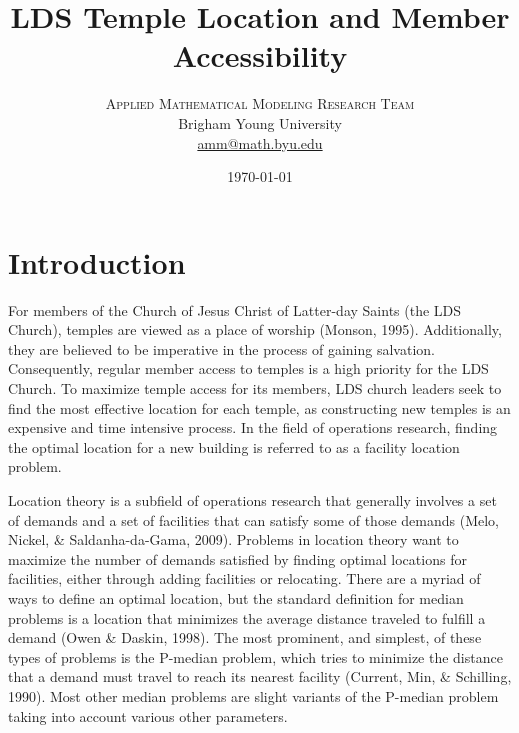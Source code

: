 \documentclass[twoside,twocolumn]{article}
\title{LDS Temple Location and Member Accessibility} %
\author{%
\textsc{Applied Mathematical Modeling Research Team}\\[1ex] %
\normalsize Brigham Young University  \\ %
\normalsize \href{mailto:amm@math.byu.edu}{amm@math.byu.edu} %
}
\date{\today} %
\begin{document}
\maketitle



\section{Introduction}


For members of the Church of Jesus Christ of Latter-day Saints (the LDS Church), temples are viewed as a place of worship (Monson, 1995).
Additionally, they are believed to be imperative in the process of gaining salvation.
Consequently, regular member access to temples is a high priority for the LDS Church.
To maximize temple access for its members, LDS church leaders seek to find the most effective location for each temple, as constructing new temples is an expensive and time intensive process.
In the field of operations research, finding the optimal location for a new building is referred to as a facility location problem.

Location theory is a subfield of operations research that generally involves a set of demands and a set of facilities that can satisfy some of those demands (Melo, Nickel, \& Saldanha-da-Gama, 2009).
Problems in location theory want to maximize the number of demands satisfied by finding optimal locations for facilities, either through adding facilities or relocating.
There are a myriad of ways to define an optimal location, but the standard definition for median problems is a location that minimizes the average distance traveled to fulfill a demand (Owen \& Daskin, 1998).
The most prominent, and simplest, of these types of problems is the P-median problem, which tries to minimize the distance that a demand must travel to reach its nearest facility (Current, Min, \& Schilling, 1990).
Most other median problems are slight variants of the P-median problem taking into account various other parameters.
\end{document}
